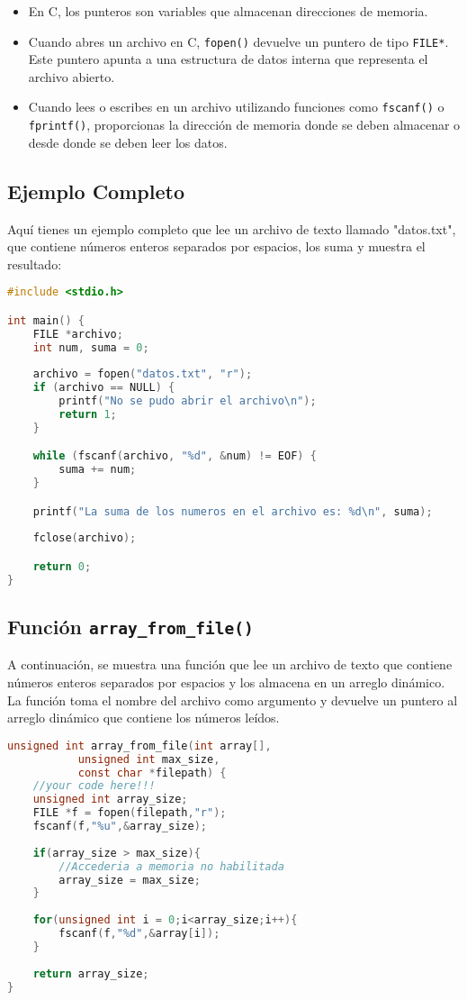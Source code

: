 \begin{itemize}
    \item En C, los punteros son variables que almacenan direcciones de memoria.
    \item Cuando abres un archivo en C, \texttt{fopen()} devuelve un puntero de tipo \texttt{FILE*}. Este puntero apunta a una estructura de datos interna que representa el archivo abierto.
    \item Cuando lees o escribes en un archivo utilizando funciones como \texttt{fscanf()} o \texttt{fprintf()}, proporcionas la dirección de memoria donde se deben almacenar o desde donde se deben leer los datos.
\end{itemize}

\subsection{Ejemplo Completo}

Aquí tienes un ejemplo completo que lee un archivo de texto llamado "datos.txt", que contiene números enteros separados por espacios, los suma y muestra el resultado:

\begin{lstlisting}[language=C]
#include <stdio.h>

int main() {
    FILE *archivo;
    int num, suma = 0;
    
    archivo = fopen("datos.txt", "r");
    if (archivo == NULL) {
        printf("No se pudo abrir el archivo\n");
        return 1;
    }

    while (fscanf(archivo, "%d", &num) != EOF) {
        suma += num;
    }

    printf("La suma de los numeros en el archivo es: %d\n", suma);
    
    fclose(archivo);

    return 0;
}
\end{lstlisting}

\subsection{Función \texttt{array\_from\_file()}}

A continuación, se muestra una función que lee un archivo de texto que contiene números enteros separados por espacios y los almacena en un arreglo dinámico. La función toma el nombre del archivo como argumento y devuelve un puntero al arreglo dinámico que contiene los números leídos.

\begin{lstlisting}[language=C]
unsigned int array_from_file(int array[],
           unsigned int max_size,
           const char *filepath) {
    //your code here!!!
	unsigned int array_size;
	FILE *f = fopen(filepath,"r");
	fscanf(f,"%u",&array_size);
	
	if(array_size > max_size){
		//Accederia a memoria no habilitada
		array_size = max_size;
	}
	
	for(unsigned int i = 0;i<array_size;i++){
		fscanf(f,"%d",&array[i]);
	}
	
	return array_size;
}
\end{lstlisting}

